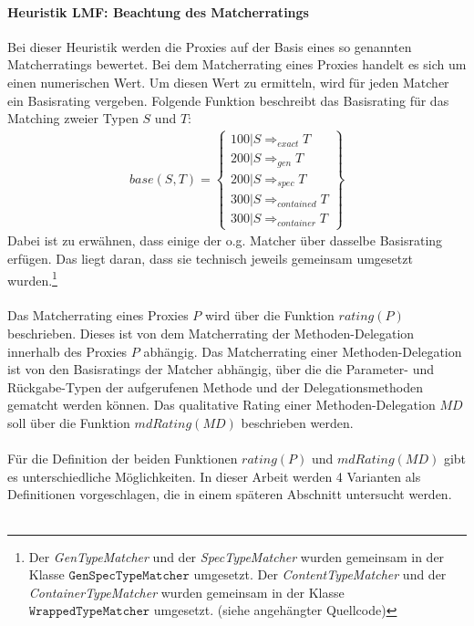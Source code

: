 \documentclass[a4paper,12pt]{article}
\begin{document}
\paragraph{Heuristik LMF: Beachtung des Matcherratings}
\noindent
\newline
Bei dieser Heuristik werden die Proxies auf der Basis eines so genannten Matcherratings bewertet. Bei dem Matcherrating eines Proxies handelt es sich um einen numerischen Wert. Um diesen Wert zu ermitteln, wird für jeden Matcher ein Basisrating vergeben. Folgende Funktion beschreibt das Basisrating für das Matching zweier Typen $S$ und $T$:
\begin{gather*}
\mathit{base(S,T)} =  \left\{ 
				\begin{array}{l}
					100 | S \Rightarrow_{exact}  T  \\
					200 | S \Rightarrow_{gen}  T  \\
					200 | S \Rightarrow_{spec}  T  \\
					300 | S \Rightarrow_{contained}  T   \\
					300 | S \Rightarrow_{container}  T  					
				\end{array}
              \right\}
\end{gather*}
\noindent
Dabei ist zu erwähnen, dass einige der o.g. Matcher über dasselbe Basisrating erfügen. Das liegt daran, dass sie technisch jeweils gemeinsam umgesetzt wurden.\footnote{Der \emph{GenTypeMatcher} und der \emph{SpecTypeMatcher} wurden gemeinsam in der Klasse $\texttt{GenSpecTypeMatcher}$ umgesetzt. Der \emph{ContentTypeMatcher} und der \emph{ContainerTypeMatcher} wurden gemeinsam in der Klasse $\texttt{WrappedTypeMatcher}$ umgesetzt. (siehe angehängter Quellcode)}\\\\
Das Matcherrating eines Proxies $P$ wird über die Funktion $\mathit{rating(P)}$ beschrieben. Dieses ist von dem Matcherrating der Methoden-Delegation innerhalb des Proxies $P$ abhängig. Das Matcherrating einer Methoden-Delegation ist von den Basisratings der Matcher abhängig, über die die Parameter- und Rückgabe-Typen der aufgerufenen Methode und der Delegationsmethoden gematcht werden können. Das qualitative Rating einer Methoden-Delegation $\mathit{MD}$ soll über die Funktion $\mathit{mdRating(MD)}$ beschrieben werden.\\\\
Für die Definition der beiden Funktionen $\mathit{rating(P)}$ und $\mathit{mdRating(MD)}$ gibt es unterschiedliche Möglichkeiten. In dieser Arbeit werden 4 Varianten als Definitionen vorgeschlagen, die in einem späteren Abschnitt untersucht werden.\\\\
\end{document}
